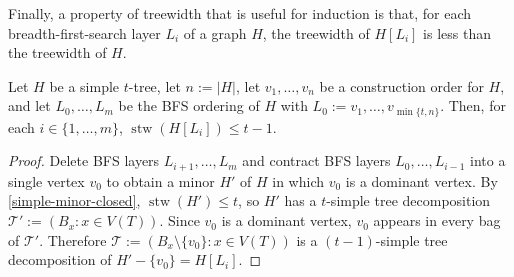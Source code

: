 \documentclass[kpfonts]{patmorin}
\DeclareMathOperator{\stw}{stw}
\theoremstyle{named}
\begin{document}
Finally, a property of treewidth that is useful for induction \cite{kundgen.pelsmajer:nonrepetitive,bose.dujmovic.ea:asymptotically} is that, for each breadth-first-search layer $L_i$ of a graph $H$, the treewidth of $H[L_i]$ is less than the treewidth of $H$.

\begin{lem}\label{simple-bfs-layers}
    Let $H$ be a simple $t$-tree, let $n:=|H|$, let $v_1,\ldots,v_n$ be a construction order for $H$, and let $L_0,\ldots,L_m$ be the BFS ordering of $H$ with $L_0:=v_1,\ldots,v_{\min\{t,n\}}$.   Then, for each $i\in\{1,\ldots,m\}$, $\stw(H[L_i])\le t-1$.
\end{lem}

\begin{proof}
    Delete BFS layers $L_{i+1},\ldots,L_m$ and contract BFS layers $L_0,\ldots,L_{i-1}$ into a single vertex $v_0$ to obtain a minor $H'$ of $H$ in which $v_0$ is a dominant vertex.  By \cref{simple-minor-closed}, $\stw(H')\le t$, so $H'$ has a $t$-simple tree decomposition $\mathcal{T}':=(B_x:x\in V(T))$.  Since $v_0$ is a dominant vertex, $v_0$ appears in every bag of $\mathcal{T}'$.  Therefore $\mathcal{T}:=(B_x\setminus\{v_0\}:x\in V(T))$ is a $(t-1)$-simple tree decomposition of $H'-\{v_0\}=H[L_i]$.
\end{proof}




\end{document}
